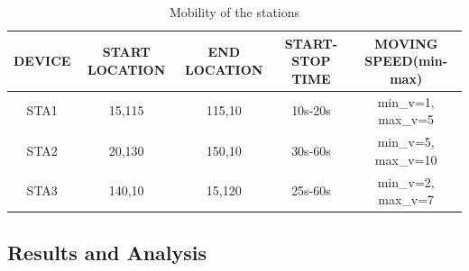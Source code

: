 \documentclass{article}
\begin{document}
    	\begin{table}[h]
        		\centering
       		\begin{tabular}{|c|c|c|c|c|}
        			\hline
        			DEVICE & START LOCATION & END LOCATION & START-STOP TIME & MOVING SPEED(min-max)  \\
        			\hline
        			STA1 & 15,115 & 115,10 & 10s-20s & min\_v=1, max\_v=5 \\
        			STA2 & 20,130 & 150,10 & 30s-60s & min\_v=5, max\_v=10 \\
        			STA3 & 140,10 & 15,120 & 25s-60s & min\_v=2, max\_v=7 \\
        			\hline
        		\end{tabular}
        \caption{Mobility of the stations}
        \label{tab:2}
    	\end{table}
\subsection{Results and Analysis}
\end{document}
